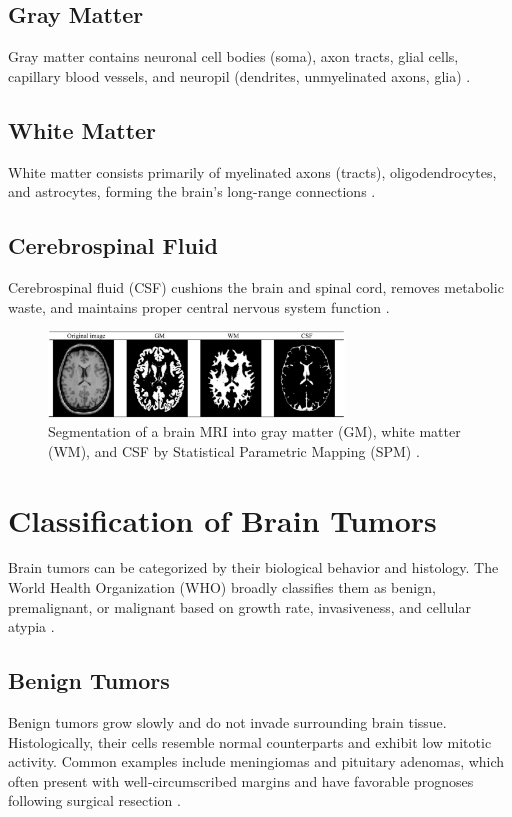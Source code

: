 \subsection*{Gray Matter}
Gray matter contains neuronal cell bodies (soma), axon tracts, glial cells, capillary blood vessels, and neuropil (dendrites, unmyelinated axons, glia) \cite{ref5}.

\subsection*{White Matter}
White matter consists primarily of myelinated axons (tracts), oligodendrocytes, and astrocytes, forming the brain’s long-range connections \cite{ref5}.

\subsection*{Cerebrospinal Fluid}
Cerebrospinal fluid (CSF) cushions the brain and spinal cord, removes metabolic waste, and maintains proper central nervous system function \cite{ref6}.

\begin{figure}[ht]
  \centering
  \includegraphics[width=0.7\textwidth]{Images/Chapter0/parts.png}
  \caption{Segmentation of a brain MRI into gray matter (GM), white matter (WM), and CSF by Statistical Parametric Mapping (SPM) \cite{ref7}.}
  \label{fig:spm-segmentation}
\end{figure}

\section{Classification of Brain Tumors}
\label{sec:classification-brain-tumors}

Brain tumors can be categorized by their biological behavior and histology. The World Health Organization (WHO) broadly classifies them as benign, premalignant, or malignant based on growth rate, invasiveness, and cellular atypia \cite{ref8}.

\subsection{Benign Tumors}
Benign tumors grow slowly and do not invade surrounding brain tissue. Histologically, their cells resemble normal counterparts and exhibit low mitotic activity. Common examples include meningiomas and pituitary adenomas, which often present with well‐circumscribed margins and have favorable prognoses following surgical resection \cite{ref8}.

